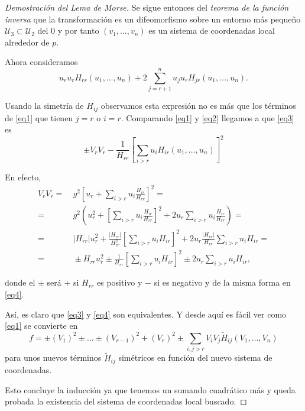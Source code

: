 \begin{proof}[Demostración del Lema de Morse]
    Se sigue entonces del \textit{teorema de la función inversa} que la transformación es un difeomorfismo sobre un entorno más pequeño $\mathcal{U}_3\subset \mathcal{U}_2$ del $0$ y por tanto $(v_1,\dots, v_n)$ es un sistema de coordenadas local alrededor de $p$.

    Ahora consideramos
    \begin{equation}
        u_ru_rH_{rr}(u_1,\dots, u_n) + 2\sum_{j=r+1}^n u_ju_rH_{jr}(u_1,\dots, u_n).
    \label{eq3}
    \end{equation}

    Usando la simetría de $H_{ij}$ observamos esta expresión no es más que los términos de \eqref{eq1} que tienen $j=r$ o $i=r$. Comparando \eqref{eq1} y \eqref{eq2} llegamos a que \eqref{eq3} es
    \begin{equation}
        \pm V_rV_r - \frac{1}{H_{rr}}\left[ \sum_{i>r} u_iH_{ir}(u_1,\dots, u_n) \right]^2
    \label{eq4}
    \end{equation}

    En efecto,
    \begin{align*}
        V_rV_r =& ~ g^2 \left[u_r+\sum_{i>r}u_i\frac{H_{ir}}{H_{rr}}\right]^2 =\\
        =& ~ g^2 \left( u_r^2 + \left[ \sum_{i>r}u_i\frac{H_{ir}}{H_{rr}}\right]^2 + 2u_r\sum_{i>r}u_i\frac{H_{ir}}{H_{rr}} \right) = \\
        =& ~ |H_{rr}| u_r^2 + \frac{|H_{rr}|}{H_{rr}^2} \left[\sum_{i>r}u_iH_{ir}\right]^2 + 2u_r\frac{|H_{rr}|}{H_{rr}}\sum_{i>r}u_iH_{ir} = \\
        =& ~ \pm H_{rr}u_r^2 \pm \frac{1}{H_{rr}}\left[\sum_{i>r}u_iH_{ir}\right]^2 \pm 2u_r\sum_{i>r}u_iH_{ir},
    \end{align*}

    donde el $\pm$ será $+$ si $H_{rr}$ es positivo y $-$ si es negativo y de la misma forma en \eqref{eq4}. 
    
    Así, es claro que \eqref{eq3} y \eqref{eq4} son equivalentes. Y desde aquí es fácil ver como \eqref{eq1} se convierte en 
    \begin{equation*}
        f = \pm (V_1)^2 \pm\dots\pm (V_{r-1})^2 + (V_r)^2  \pm \sum_{i,j > r} V_iV_j\tilde{H}_{ij}(V_1,\dots,V_n)
    \end{equation*}
    para unos nuevos términos $\tilde{H}_{ij}$ simétricos en función del nuevo sistema de coordenadas.

    Esto concluye la inducción ya que tenemos un sumando cuadrático más y queda probada la existencia del sistema de coordenadas local buscado.
    
\end{proof}

